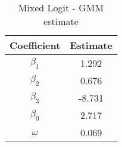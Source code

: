 \begin{table}[h!]
\centering
\caption{Mixed Logit - GMM estimate}\label{tab:mixed-gmm}
\begin{tabular}{cc}
 \hline 
Coefficient & Estimate \\ \hline 
$\beta_1$ & 1.292 \\ 
$\beta_2$ & 0.676 \\ 
$\beta_3$ & -8.731 \\ 
$\beta_0$ & 2.717 \\ 
$\omega$ & 0.069 \\ 
\hline
\end{tabular}
\end{table}

